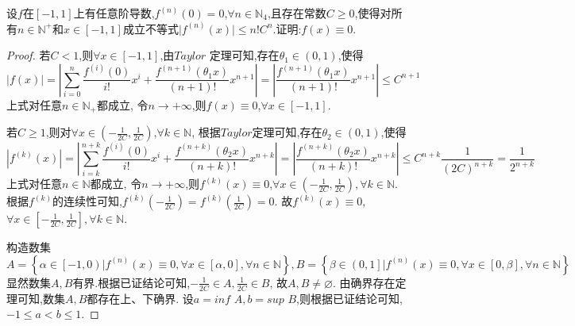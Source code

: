\documentclass[lang=cn,newtx,10pt,scheme=chinese]{elegantbook}
\begin{document}
\begin{exercise}
    设\(f\)在\([-1,1]\)上有任意阶导数,\(f^{(n)}(0)=0\),\(\forall n\in\mathbb{N}_4\),且存在常数\(C\geq0\),使得对所有\(n\in\mathbb{N}^+\)和\(x\in[-1,1]\)成立不等式\(\vert f^{(n)}(x)\vert\leq n!C^{n}\).证明:\(f(x)\equiv0\).
    \begin{proof}
        若$C<1$,则$\forall x\in[-1,1]$,由$Taylor$ 定理可知,存在$\theta_1\in(0,1)$,使得
        \begin{equation}
            \left| f\left( x \right) \right|=\left| \sum_{i=0}^n{\frac{f^{\left( i \right)}\left( 0 \right)}{i!}x^i}+\frac{f^{\left( n+1 \right)}\left( \theta_1 x \right)}{\left( n+1 \right) !}x^{n+1} \right|=\left| \frac{f^{\left( n+1 \right)}\left( \theta_1 x \right)}{\left( n+1 \right) !}x^{n+1} \right|\leqslant C^{n+1}
            \nonumber
        \end{equation}
        上式对任意$n\in\mathbb{N} _+$都成立,
        令$n \to +\infty$,则$f(x)\equiv0$,$\forall x\in[-1,1]$.

        若$C\ge 1$,则对$\forall x\in(-\frac{1}{2C},\frac{1}{2C})$,$\forall k\in \mathbb{N}$,
        根据$Taylor$定理可知,存在$\theta_2\in(0,1)$,使得
        \begin{equation}
            \left| f^{\left( k \right)}\left( x \right) \right|=\left| \sum_{i=k}^{n+k}{\frac{f^{\left( i \right)}\left( 0 \right)}{i!}x^i}+\frac{f^{\left( n+k \right)}\left( \theta_2 x \right)}{\left( n+k \right) !}x^{n+k} \right|=\left| \frac{f^{\left( n+k \right)}\left( \theta_2 x \right)}{\left( n+k \right) !}x^{n+k} \right|\leqslant C^{n+k}\frac{1}{\left( 2C \right) ^{n+k}}=\frac{1}{2^{n+k}}
            \nonumber
        \end{equation}
        上式对任意$n\in\mathbb{N}$都成立,
        令$n\to+\infty$,则$f^{(k)}(x)\equiv0$,$\forall x\in(-\frac{1}{2C},\frac{1}{2C}),\forall k\in \mathbb{N}$.
        根据$f^{(k)}$的连续性可知,$f^{(k)}(-\frac{1}{2C})=f^{(k)}(\frac{1}{2C})=0$.
        故$f^{(k)}(x)\equiv0$,$\forall x\in[-\frac{1}{2C},\frac{1}{2C}],\forall k\in \mathbb{N}$.

        构造数集
        \begin{equation}
            A=\left\{ \alpha \in \left[ -1,0 \right) |f^{\left( n \right)}\left( x \right) \equiv 0,\forall x\in \left[ \alpha ,0 \right] ,\forall n\in \mathbb{N} \right\} ,B=\left\{ \beta \in \left( 0,1 \right] |f^{\left( n \right)}\left( x \right) \equiv 0,\forall x\in \left[ 0,\beta \right] ,\forall n\in \mathbb{N} \right\} 
            \nonumber
        \end{equation}
        显然数集$A,B$有界.根据已证结论可知,$-\frac{1}{2C}\in A,\frac{1}{2C}\in B$,
        故$A,B\ne \varnothing$.
        由确界存在定理可知,数集$A,B$都存在上、下确界.
        设$a=inf\,\,A,b=sup\,\,B$,则根据已证结论可知,$-1\le a<b\le 1$.
        

\end{proof}
\end{exercise}
\end{document}
